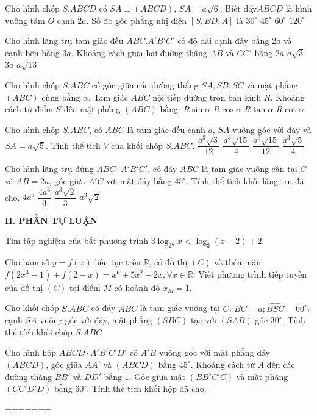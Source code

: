 \begin{ex}
Cho hình chóp $S.ABCD$ có $SA\perp (ABCD)$, $SA=a\sqrt{6}$. Biết đáy$ABCD$ là hình vuông tâm $O$ cạnh $2a$. Số đo góc phẳng nhị diện $\left[S, BD, A\right]$ là
\choice
{${{30}^\circ}$}
{${{45}^\circ}$}
{\True ${{60}^\circ}$}
{${{120}^\circ}$}
\end{ex}
\begin{ex}
Cho hình lăng trụ tam giác đều $ABC.A'B'C'$ có độ dài cạnh đáy bằng $2a$ và cạnh bên bằng $3a$. Khoảng cách giữa hai đường thẳng $AB$ và $CC'$ bằng
\choice
{$2a$}
{\True $a\sqrt{3}$}
{$3a$}
{$a\sqrt{13}$}
\end{ex}
\begin{ex}
Cho hình chóp $S.ABC$ có góc giữa các đường thẳng $SA, SB, SC$ và mặt phẳng $(ABC)$ cùng bằng $\alpha $. Tam giác $ABC$ nội tiếp đường tròn bán kính $R$. Khoảng cách từ điểm $S$ đến mặt phẳng $(ABC)$ bằng:
\choice
{$R\sin \alpha $}
{$R\cos \alpha $}
{\True $R\tan \alpha $}
{$R\cot \alpha $}
\end{ex}
\begin{ex}
Cho hình chóp $S.ABC$, có $ABC$ là tam giác đều cạnh $a$, $SA$ vuông góc với đáy và $SA=a\sqrt{5}$. Tính thể tích $V$ của khối chóp $S.ABC$.
\choice
{$\dfrac{a^3\sqrt{3}}{12}$}
{$\dfrac{a^3\sqrt{15}}{4}$}
{\True $\dfrac{a^3\sqrt{15}}{12}$}
{$\dfrac{a^3\sqrt{5}}{4}$}
\end{ex}
\begin{ex}
Cho hình lăng trụ đứng $ABC \cdot A'B'C'$, có đáy $ABC$ là tam giác vuông cân tại $C$ và $AB=2a$, góc giữa $A'C$ với mặt đáy bằng ${{45}^\circ}$. Tính thể tích khối lăng trụ đã cho.
\choice
{$4a^3$}
{$\dfrac{4a^3}{3}$}
{$\dfrac{a^3\sqrt{2}}{3}$}
{\True $a^3\sqrt{2}$}
\end{ex}

\noindent\textbf{II. PHẦN TỰ LUẬN}

\begin{ex}
Tìm tập nghiệm của bất phương trình $3\log_{27} x <\log_{3}(x-2)+2.$
\end{ex}
\begin{ex}
Cho hàm số $y=f(x)$ liên tục trên $\mathbb{R}$, có đồ thị $(C)$ và thỏa mãn $f\left(2x^3-1\right)+f(2-x)=x^6+5x^2-2x,\forall x\in \mathbb{R}$. Viết phương trình tiếp tuyến của đồ thị $(C)$ tại điểm $M$ có hoành độ $x_M=1$.
\end{ex}
\begin{ex}
Cho khối chóp $S.ABC$ có đáy $ABC$ là tam giác vuông tại $C$, $BC=a;\widehat{BSC}=60^\circ $, cạnh $SA$ vuông góc với đáy, mặt phẳng $(SBC)$ tạo với $(SAB)$ góc $30^\circ $. Tính thể tích khối chóp $S.ABC$
\end{ex}
\begin{ex}
Cho hình hộp $ABCD \cdot A'B'C'D'$ có $A'B$ vuông góc với mặt phẳng đáy $(ABCD)$, góc giữa $AA'$ và $(ABCD)$ bằng $45^\circ $. Khoảng cách từ $A$ đến các đường thẳng $BB'$ và $DD'$ bằng $1$. Góc giữa mặt $\left(BB'C'C\right)$ và mặt phẳng $\left(CC'D'D\right)$ bằng $60^\circ $. Tính thể tích khối hộp đã cho.
\end{ex}
=======
